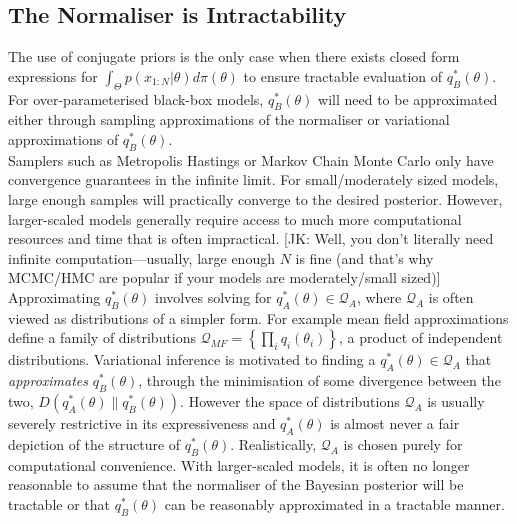\documentclass[twoside,11pt]{article}
\newcommand{\jk}[1]{{\color{blue} [JK: #1]}}
\begin{document}
\subsection{The Normaliser is Intractability}
The use of conjugate priors is the only case when there exists closed form expressions for $\int_{\Theta} p(x_{1:N}|\theta) d \pi(\theta)$ to ensure tractable evaluation of $q_B^*(\theta)$. For over-parameterised black-box models, $q_B^*(\theta)$ will need to be approximated either through sampling approximations of the normaliser or variational approximations of $q_B^*(\theta)$.
\newline
\\Samplers such as Metropolis Hastings or Markov Chain Monte Carlo only have convergence guarantees in the infinite limit. For small/moderately sized models, large enough samples will practically converge to the desired posterior. However, larger-scaled models generally require access to much more computational resources and time that is often impractical.  
\jk{Well, you don't literally need infinite computation---usually, large enough $N$ is fine (and that's why MCMC/HMC are popular if your models are moderately/small sized)}
\newline
\\Approximating $q_B^*(\theta)$ involves solving for $q_A^*(\theta) \in \mathcal{Q}_{A}$, where $\mathcal{Q}_{A}$ is often viewed as distributions of a simpler form. For example mean field approximations define a family of distributions $\mathcal{Q}_{MF} = \left\{\prod_i q_i(\theta_i)\right\}$, a product of independent distributions. Variational inference is motivated to finding a $q_A^*(\theta) \in \mathcal{Q}_{A}$ that \textit{approximates} $q_B^*(\theta)$, through the minimisation of some divergence between the two, $D(q_A^*(\theta)\| q_B^*(\theta))$. However the space of distributions $\mathcal{Q}_{A}$ is usually severely restrictive in its expressiveness and $q_A^*(\theta)$ is almost never a fair depiction of the structure of $q_B^*(\theta)$. Realistically, $\mathcal{Q}_{A}$ is chosen purely for computational convenience. With larger-scaled models, it is often no longer reasonable to assume that the normaliser of the Bayesian posterior will be tractable or that $q_B^*(\theta)$ can be reasonably approximated in a tractable manner.
\end{document}
